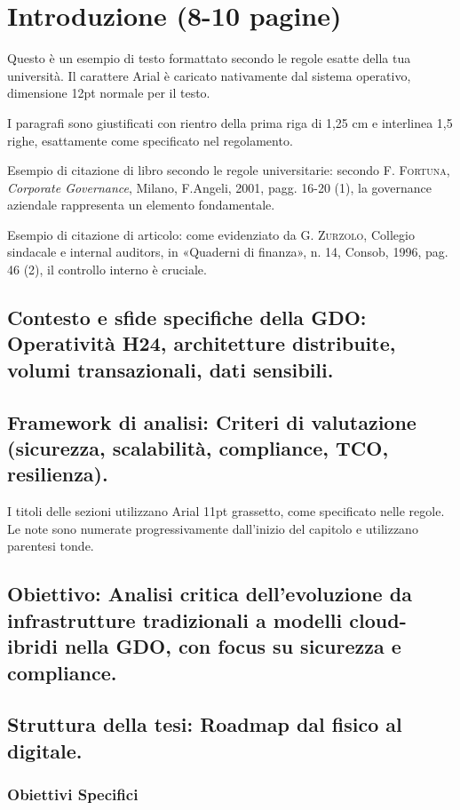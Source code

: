 \documentclass[12pt,a4paper,oneside]{book}
\newcommand{\autore}[1]{\textsc{#1}}
\newcommand{\citlibro}[6]{%
    \autore{#1}, \textit{#2}, #3, #4, #5, pagg. #6%
}
\newcommand{\citarticolo}[7]{%
    \autore{#1}, #2, in «#3», n. #4, #5, #6, pag. #7%
}
\begin{document}

\chapter{Introduzione (8-10 pagine)}

Questo è un esempio di testo formattato secondo le regole esatte della tua università. Il carattere Arial è caricato nativamente dal sistema operativo, dimensione 12pt normale per il testo.

I paragrafi sono giustificati con rientro della prima riga di 1,25 cm e interlinea 1,5 righe, esattamente come specificato nel regolamento.

Esempio di citazione di libro secondo le regole universitarie: secondo \citlibro{F. Fortuna}{Corporate Governance}{Milano}{F.Angeli}{2001}{16-20}(1), la governance aziendale rappresenta un elemento fondamentale.

Esempio di citazione di articolo: come evidenziato da \citarticolo{G. Zurzolo}{Collegio sindacale e internal auditors}{Quaderni di finanza}{14}{Consob}{1996}{46}(2), il controllo interno è cruciale.

\section{Contesto e sfide specifiche della GDO: Operatività H24, architetture distribuite, volumi transazionali,
dati sensibili.}
\section{Framework di analisi: Criteri di valutazione (sicurezza, scalabilità, compliance, TCO, resilienza).}
I titoli delle sezioni utilizzano Arial 11pt grassetto, come specificato nelle regole. Le note sono numerate progressivamente dall'inizio del capitolo e utilizzano parentesi tonde.
\section{Obiettivo: Analisi critica dell'evoluzione da infrastrutture tradizionali a modelli cloud-ibridi nella GDO,
con focus su sicurezza e compliance.}
\section{Struttura della tesi: Roadmap dal fisico al digitale.}
\subsection{Obiettivi Specifici}
\end{document}
